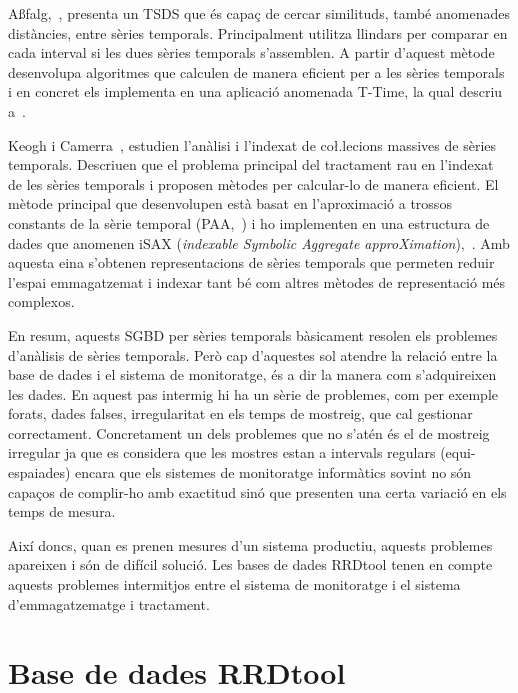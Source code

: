 A{\ss}falg,~\cite{assfalg08:thesis}, presenta un TSDS que és capaç de
cercar similituds, també anomenades distàncies, entre sèries temporals. Principalment utilitza llindars per comparar en cada interval si les dues sèries temporals s'assemblen. A partir d'aquest mètode desenvolupa algoritmes que calculen de manera eficient per a les sèries temporals i en concret els implementa en una aplicació anomenada T-Time, la qual descriu a~\cite{assfalg08:ttime}.

Keogh i Camerra~\cite{keogh08:isax,keogh10:isax}, 
estudien l'anàlisi i l'indexat de co\l.lecions massives de sèries temporals. Descriuen que el problema principal del tractament rau en l'indexat de les sèries temporals i proposen mètodes per calcular-lo de manera eficient. El mètode principal que desenvolupen està basat en l'aproximació a trossos constants de la sèrie temporal (PAA,~\cite{keogh00}) i ho implementen en una estructura de dades que anomenen iSAX (\emph{indexable Symbolic Aggregate approXimation}),~\cite{isax}. Amb aquesta eina s'obtenen representacions de sèries temporals que permeten reduir l'espai emmagatzemat i indexar tant bé com altres mètodes de representació més complexos.




En resum, aquests SGBD per sèries temporals bàsicament resolen els problemes d'anàlisis de sèries temporals.
Però cap d'aquestes sol atendre la relació entre la base de dades i el sistema de monitoratge, és a dir la manera com s'adquireixen les dades. En aquest pas intermig hi ha un sèrie de problemes, com per exemple forats, dades falses, irregularitat en els temps de mostreig, que cal gestionar correctament. Concretament un dels problemes que no s'atén és el de mostreig irregular ja que es considera que les mostres estan a intervals regulars (equi-espaiades) encara que els sistemes de monitoratge informàtics sovint no són capaços de complir-ho amb exactitud sinó que presenten una certa variació en els temps de mesura. 

Així doncs, quan es prenen mesures d'un sistema productiu, aquests problemes apareixen i són de difícil solució.
Les bases de dades RRDtool tenen en compte aquests problemes intermitjos entre el sistema de monitoratge i el sistema d'emmagatzematge i tractament. 






\section{Base de dades RRDtool}

